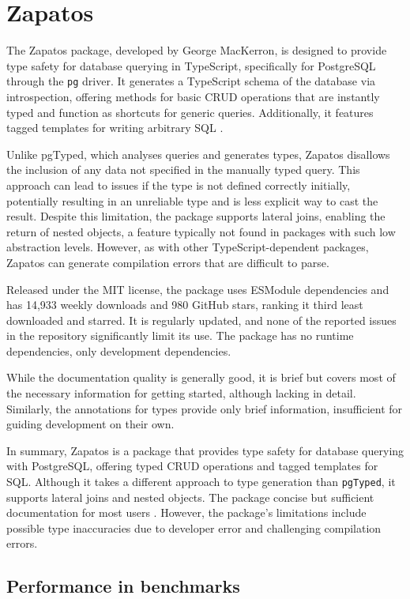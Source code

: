 \section{Zapatos}
The Zapatos package, developed by George MacKerron, is designed to provide type
safety for database querying in TypeScript, specifically for PostgreSQL through
the \texttt{pg} driver. It generates a TypeScript schema of the database via
introspection, offering methods for basic CRUD operations that are instantly
typed and function as shortcuts for generic queries. Additionally, it features
tagged templates for writing arbitrary SQL \cite{zapatos}.

Unlike pgTyped, which analyses queries and generates types, Zapatos disallows
the inclusion of any data not specified in the manually typed query. This
approach can lead to issues if the type is not defined correctly initially,
potentially resulting in an unreliable type and is less explicit way to cast the
result. Despite this limitation, the package supports lateral joins, enabling
the return of nested objects, a feature typically not found in packages with
such low abstraction levels. However, as with other TypeScript-dependent
packages, Zapatos can generate compilation errors that are difficult to parse.

Released under the MIT license, the package uses ESModule dependencies and has
14,933 weekly downloads and 980 GitHub stars, ranking it third least downloaded
and starred. It is regularly updated, and none of the reported issues in the
repository significantly limit its use. The package has no runtime dependencies,
only development dependencies.

While the documentation quality is generally good, it is brief but covers most
of the necessary information for getting started, although lacking in detail.
Similarly, the annotations for types provide only brief information,
insufficient for guiding development on their own.

In summary, Zapatos is a package that provides type safety for database querying
with PostgreSQL, offering typed CRUD operations and tagged templates for SQL.
Although it takes a different approach to type generation than \texttt{pgTyped},
it supports lateral joins and nested objects. The package concise but sufficient
documentation for most users \cite{zapatosDocs}. However, the package's
limitations include possible type inaccuracies due to developer error and
challenging compilation errors. 

\subsection*{Performance in benchmarks}

